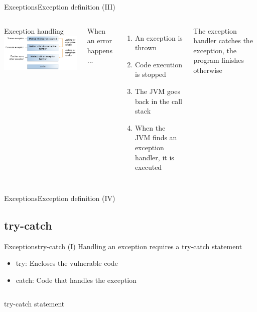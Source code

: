 \documentclass[10pt,compress]{beamer} %
\begin{document}
\begin{frame}{Exceptions}{Exception definition (III)}
    \begin{columns}
		\centering Exception handling
		\includegraphics[width=0.8\linewidth]{figs/exceptions-errorOccurs.png}

		When an error happens ...
		\begin{enumerate}
		\item An exception is thrown
		\item Code execution is stopped
		\item The JVM goes back in the call stack
		\item When the JVM finds an exception handler, it is executed
		\end{enumerate}
		The exception handler catches the exception, the program finishes otherwise
	\end{columns}
\end{frame}

\begin{frame}{Exceptions}{Exception definition (IV)}
	
\end{frame}

\subsection{try-catch}
\begin{frame}{Exceptions}{try-catch (I)}
	Handling an exception requires a try-catch statement
	\begin{itemize}
		\item try: Encloses the vulnerable code
		\item catch: Code that handles the exception
	\end{itemize}

    \begin{columns}
	\begin{block}{try-catch statement}
	\vspace{-0.2cm}
		
	\vspace{-0.2cm}
	\end{block}
	\end{columns}
\end{frame}
\end{document}
